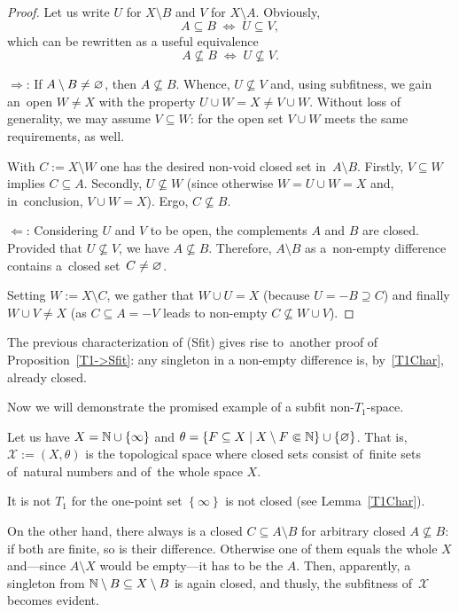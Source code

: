 \begin{proof}
  Let us write $U$ for $X\setminus B$ and $V$ for $X\setminus A$.
  Obviously,
  \[
    A\subseteq B \; \Leftrightarrow \; U\subseteq V,
  \]
  which can be rewritten as a useful equivalence
  \[
    A\not\subseteq B \; \Leftrightarrow \; U\not\subseteq V.
  \]

  $\Rightarrow$: If $A\setminus B \ne \varnothing$, then $A\not\subseteq B$.
  Whence, $U\not\subseteq V$ and, using subfitness, we gain an~open $W \ne X$
  with the property $U \cup W = X \ne V \cup W$. 
  Without loss of generality, we may assume $V\subseteq W$: for the open set $V
  \cup W$ meets the same requirements, as well.

  With $C := X \setminus W$ one has the desired non-void closed set
  in~$A\setminus B$.
  Firstly, $V\subseteq W$ implies $C\subseteq A$.
  Secondly, $U\not\subseteq W$ (since otherwise $W = U \cup W = X$ and,
  in~conclusion, $V \cup W = X$).
  Ergo, $C\not\subseteq B$.

  $\Leftarrow$: Considering $U$ and $V$ to be open, the complements $A$ and $B$
  are closed.
  Provided that $U\not\subseteq V$, we have $A\not\subseteq B$.
  Therefore, $A \setminus B$ as a~non-empty difference contains a~closed
  set~$C \ne \varnothing$.

  Setting $W := X \setminus C$, we gather that $W \cup U = X$ (because $U =
  \minus B \supseteq C$) and finally $W \cup V \ne X$ (as $C\subseteq A =
  \minus V$ leads to non-empty $C\not\subseteq W \cup V$).
\end{proof}

\begin{rem}
  The previous characterization of (Sfit) gives rise to~another proof of
  Proposition~\ref{T1->Sfit}\thinspace:
  any singleton in a non-empty difference is, by~\ref{T1Char}\thinspace,
  already closed.
\end{rem}

Now we will demonstrate the promised example of a subfit non-$T_1$-space.

\begin{exmpl}
  Let us have $X = \mathbb{N} \cup \left\{\infty\right\}$ and $\theta = \left\{
  F\subseteq X \mid X\setminus F \Subset \mathbb{N} \right\} \cup \left\{ \varnothing
  \right\}$.
  That is, $\mathcal{X} := (X, \theta)$ is the topological space where closed
  sets consist of~finite sets of~natural numbers and of~the whole space $X$.

  It is not $T_1$ for the one-point set $\left\{ \infty \right\}$ is not
  closed (see Lemma~\ref{T1Char}).

  On the other hand, there always is a closed $C \subseteq A\setminus B$ for
  arbitrary closed $A\not\subseteq B$:
  if both are finite, so is their difference.
  Otherwise one of them equals the whole $X$ and---since $A\setminus X$ would
  be empty---it has to be the $A$.
  Then, apparently, a singleton from $\mathbb{N}\setminus B \subseteq X\setminus B$ is
  again closed, and thusly, the subfitness of~$\mathcal{X}$ becomes evident.
\end{exmpl}
